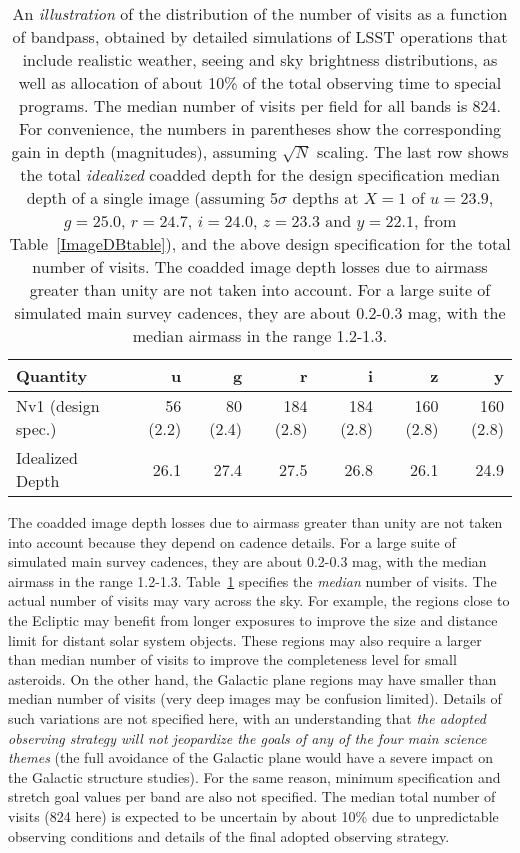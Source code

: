 \begin{table}[h]
\begin{tabular}{|l|r|r|r|r|r|r|}
\hline
   Quantity           &   u   &   g    &   r   &   i   &   z   &  y   \\
\hline
 Nv1 (design spec.)   &  56 (2.2) & 80 (2.4) &  184 (2.8) & 184 (2.8) & 160 (2.8) & 160 (2.8) \\
\hline
Idealized Depth         &    26.1   &    27.4  &     27.5   &  26.8     &   26.1    & 24.9  \\
\hline
\end{tabular}
\caption{An {\it illustration} of the distribution of the number of visits as
a function of bandpass, obtained by detailed simulations of LSST operations
that include realistic weather, seeing and sky brightness distributions,
as well as allocation of about 10\% of the
total observing time to special programs. The median
number of visits per field for all bands is 824. For convenience, the numbers in
parentheses show the corresponding gain in depth (magnitudes), assuming
$\sqrt{N}$ scaling. The last row shows the total {\it idealized} coadded
depth for the design specification median depth of a single image (assuming
5$\sigma$ depths at $X=1$ of $u=23.9$, $g=25.0$, $r=24.7$, $i=24.0$, $z=23.3$ and
$y=22.1$, from Table~\ref{ImageDBtable}), and the above design specification
for the total number of visits.  The coadded image depth losses due to airmass
greater than unity are not taken into account. For a large suite of simulated main survey
cadences, they are about 0.2-0.3 mag, with the median airmass in the range 1.2-1.3.
}
\label{TdepthCoadd}
\end{table}

The coadded image depth losses due to airmass greater than unity are not
taken into account because they depend on cadence details. For a large suite
of simulated main survey cadences, they are about 0.2-0.3 mag, with the median airmass in
the range 1.2-1.3.
Table~\ref{TdepthCoadd} specifies the {\it median} number of visits. The actual
number of visits may vary across the sky. For example, the regions close to
the Ecliptic may benefit from longer exposures to improve the size and distance
limit for distant solar system objects. These regions may also require a
larger than median number of visits to improve
the completeness level for small asteroids. On the other hand, the Galactic
plane regions may have smaller than median number of visits (\eg very deep
images may be confusion limited). Details of such variations are not specified
here, with an understanding that {\it the adopted observing strategy will not
jeopardize the goals of any of the four main science themes} (\eg the full
avoidance of the Galactic plane would have a severe impact on the Galactic
structure studies). For the same reason, minimum specification
and stretch goal values per band are also not specified. The median total number of visits
(824 here) is expected to be uncertain by about 10\% due to unpredictable
observing conditions and details of the final adopted observing strategy.



